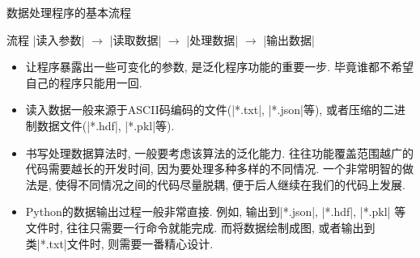 \documentclass{beamer}
\begin{document}
    \begin{frame}[fragile]{数据处理程序的基本流程}
      \begin{block}{流程}
        \cverb|读入参数| \(\to\) \cverb|读取数据| \(\to\) \cverb|处理数据| \(\to\) \cverb|输出数据|
      \end{block}
      \begin{block}{}
        \begin{itemize}\small
          \item 让程序暴露出一些可变化的参数, 是泛化程序功能的重要一步. 毕竟谁都不希望自己的程序只能用一回. 
          \item 读入数据一般来源于ASCII码编码的文件(\cverb|*.txt|, \cverb|*.json|等), 或者压缩的二进制数据文件(\cverb|*.hdf|, \cverb|*.pkl|等).
          \item 书写处理数据算法时, 一般要考虑该算法的泛化能力. 往往功能覆盖范围越广的代码需要越长的开发时间, 因为要处理多种多样的不同情况. 一个非常明智的做法是, 使得不同情况之间的代码尽量脱耦, 便于后人继续在我们的代码上发展.
          \item Python的数据输出过程一般非常直接. 例如, 输出到\cverb|*.json|, \cverb|*.hdf|, \cverb|*.pkl| 等文件时, 往往只需要一行命令就能完成. 而将数据绘制成图, 或者输出到类\cverb|*.txt|文件时, 则需要一番精心设计.
        \end{itemize}
      \end{block}
    \end{frame}
\end{document}
